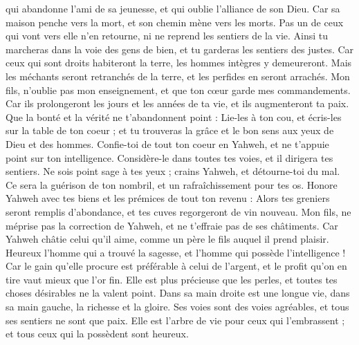 \begin{multicols}{2}
qui abandonne l’ami de sa jeunesse, et qui oublie l'alliance de son Dieu.
Car sa maison penche vers la mort, et son chemin mène vers les morts.
Pas un de ceux qui vont vers elle n'en retourne, ni ne reprend les sentiers de la vie.
Ainsi tu marcheras dans la voie des gens de bien, et tu garderas les sentiers des justes.
Car ceux qui sont droits habiteront la terre, les hommes intègres y demeureront.
Mais les méchants seront retranchés de la terre, et les perfides en seront arrachés.
\VerseOne{}Mon fils, n’oublie pas mon enseignement, et que ton cœur garde mes commandements.
Car ils prolongeront les jours et les années de ta vie, et ils augmenteront  ta paix.
Que la bonté et la vérité ne t'abandonnent point : Lie-les à ton cou, et écris-les sur la table de ton coeur ;
et tu trouveras la grâce et le bon sens aux yeux de Dieu et des hommes.
Confie-toi de tout ton coeur en Yahweh, et ne t'appuie point sur ton intelligence.
Considère-le dans toutes tes voies, et il dirigera tes sentiers.
Ne sois point sage à tes yeux ; crains Yahweh, et détourne-toi du mal.
Ce sera la guérison de ton nombril, et un rafraîchissement pour tes os.
Honore Yahweh avec tes biens et les prémices de tout ton revenu :
Alors tes greniers seront remplis d'abondance, et tes cuves regorgeront de vin nouveau.
Mon fils, ne méprise pas la correction de Yahweh, et ne t’effraie pas de ses châtiments.
Car Yahweh châtie celui qu'il aime, comme un père le fils auquel il prend plaisir.
Heureux l’homme qui a trouvé la sagesse, et l'homme qui possède l'intelligence !
Car le gain qu'elle procure est préférable à celui de l'argent, et le profit qu'on en tire vaut mieux que l’or fin.
Elle est plus précieuse que les perles, et toutes tes choses désirables ne la valent point.
Dans sa main droite est une longue vie, dans sa main gauche, la richesse et la gloire.
Ses voies sont des voies agréables, et tous ses sentiers ne sont que paix.
Elle est l'arbre de vie pour ceux qui l'embrassent ; et tous ceux qui la possèdent sont heureux.

\end{multicols}
